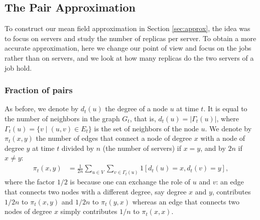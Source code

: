 \documentclass[acmsmall,nonacm]{acmart}
\begin{document}
\subsection{The Pair Approximation}\label{sec:PSpair}

To construct our mean field approximation in Section \ref{sec:approx}, the idea was to focus on servers and study the number of replicas per server. To obtain a more accurate approximation, here we change our point of view and focus on the jobs rather than on servers, and we look at how many replicas do the two servers of a job hold. 

\subsubsection{Fraction of pairs}
As before, we denote by $d_t(u)$ the degree of a node $u$ at time $t$. It is equal to the number of neighbors in the graph $G_t$, that is, $d_t(u) = |\Gamma_t(u)|$, where $\Gamma_t(u)=\{v \mid (u,v) \in E_t\}$ is the set of neighbors of the node $u$.  We denote by $\pi_t(x,y)$ the number of edges that connect a node of degree $x$ with a node of degree $y$ at time $t$ divided by $n$ (the number of servers) if $x=y$, and by $2n$
if $x \not=y$:
\begin{align}
    \label{eq:pi(x,y)}
    \pi_t(x,y) &= \frac{1}{2n} \sum_{u \in V} \sum_{v \in \Gamma_t(u)} 1[d_t(u)=x, d_t(v)=y],
\end{align}
where the factor $1/2$ is because one can exchange the role of $u$ and $v$: an edge that connects two nodes with a different degree, say degree $x$ and $y$, contributes $1/2n$ to $\pi_t(x,y)$ and $1/2n$ to $\pi_t(y,x)$ whereas an edge that connects two nodes of degree $x$ simply contributes $1/n$ to $\pi_t(x,x)$. 
\end{document}
